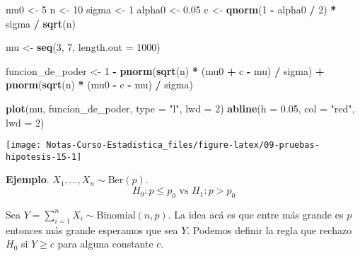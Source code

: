 \documentclass[
  12pt,
]{book}
\newenvironment{Shaded}{\begin{snugshade}}{\end{snugshade}}
\newcommand{\DataTypeTok}[1]{\textcolor[rgb]{0.13,0.29,0.53}{#1}}
\newcommand{\DecValTok}[1]{\textcolor[rgb]{0.00,0.00,0.81}{#1}}
\newcommand{\FloatTok}[1]{\textcolor[rgb]{0.00,0.00,0.81}{#1}}
\newcommand{\KeywordTok}[1]{\textcolor[rgb]{0.13,0.29,0.53}{\textbf{#1}}}
\newcommand{\NormalTok}[1]{#1}
\newcommand{\OperatorTok}[1]{\textcolor[rgb]{0.81,0.36,0.00}{\textbf{#1}}}
\newcommand{\StringTok}[1]{\textcolor[rgb]{0.31,0.60,0.02}{#1}}
\begin{document}
\begin{Shaded}
\begin{Highlighting}[]
\NormalTok{mu0 \textless{}{-}}\StringTok{ }\DecValTok{5}
\NormalTok{n \textless{}{-}}\StringTok{ }\DecValTok{10}
\NormalTok{sigma \textless{}{-}}\StringTok{ }\DecValTok{1}
\NormalTok{alpha0 \textless{}{-}}\StringTok{ }\FloatTok{0.05}
\NormalTok{c \textless{}{-}}\StringTok{ }\KeywordTok{qnorm}\NormalTok{(}\DecValTok{1} \OperatorTok{{-}}\StringTok{ }\NormalTok{alpha0 }\OperatorTok{/}\StringTok{ }\DecValTok{2}\NormalTok{) }\OperatorTok{*}\StringTok{ }\NormalTok{sigma }\OperatorTok{/}\StringTok{ }\KeywordTok{sqrt}\NormalTok{(n)}

\NormalTok{mu \textless{}{-}}\StringTok{ }\KeywordTok{seq}\NormalTok{(}\DecValTok{3}\NormalTok{, }\DecValTok{7}\NormalTok{, }\DataTypeTok{length.out =} \DecValTok{1000}\NormalTok{)}

\NormalTok{funcion\_de\_poder \textless{}{-}}\StringTok{ }\DecValTok{1} \OperatorTok{{-}}
\StringTok{  }\KeywordTok{pnorm}\NormalTok{(}\KeywordTok{sqrt}\NormalTok{(n) }\OperatorTok{*}\StringTok{ }\NormalTok{(mu0 }\OperatorTok{+}\StringTok{ }\NormalTok{c }\OperatorTok{{-}}\StringTok{ }\NormalTok{mu) }\OperatorTok{/}\StringTok{ }\NormalTok{sigma) }\OperatorTok{+}
\StringTok{  }\KeywordTok{pnorm}\NormalTok{(}\KeywordTok{sqrt}\NormalTok{(n) }\OperatorTok{*}\StringTok{ }\NormalTok{(mu0 }\OperatorTok{{-}}\StringTok{ }\NormalTok{c }\OperatorTok{{-}}\StringTok{ }\NormalTok{mu) }\OperatorTok{/}\StringTok{ }\NormalTok{sigma)}

\KeywordTok{plot}\NormalTok{(mu, funcion\_de\_poder, }\DataTypeTok{type =} \StringTok{"l"}\NormalTok{, }\DataTypeTok{lwd =} \DecValTok{2}\NormalTok{)}
\KeywordTok{abline}\NormalTok{(}\DataTypeTok{h =} \FloatTok{0.05}\NormalTok{, }\DataTypeTok{col =} \StringTok{"red"}\NormalTok{, }\DataTypeTok{lwd =} \DecValTok{2}\NormalTok{)}
\end{Highlighting}
\end{Shaded}

\begin{center}\texttt{[image: Notas-Curso-Estadistica\_files/figure-latex/09-pruebas-hipotesis-15-1]} \end{center}

\textbf{Ejemplo}. \(X_1,\dots,X_n \sim \text{Ber}(p)\).
\[H_0: p\leq p_{0} \text{ vs } H_1: p>p_0\]

Sea \(Y = \sum_{i=1}^nX_i \sim \text{Binomial}(n,p)\).
La idea acá es que entre más grande es \(p\) entonces más grande esperamos que
sea \(Y\). Podemos definir la regla que rechazo \(H_0\) si \(Y\geq c\) para alguna
constante \(c\).
\end{document}
